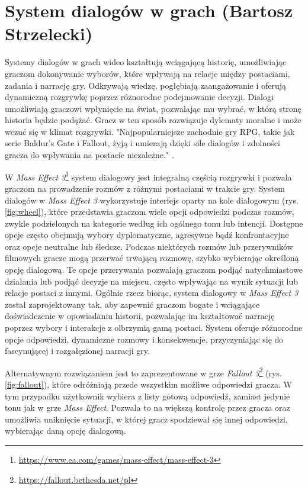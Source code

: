 \section{System dialogów w grach (Bartosz Strzelecki)}\label{chap:dialogi}
Systemy dialogów w grach wideo kształtują wciągającą historię, umożliwiając graczom dokonywanie wyborów, które wpływają na relacje między postaciami, zadania i narrację gry. 
Odkrywają wiedzę, pogłębiają zaangażowanie i oferują dynamiczną rozgrywkę poprzez różnorodne podejmowanie decyzji.
Dialogi umożliwiają graczowi wpłynięcie na świat, pozwalając mu wybrać, w którą stronę historia będzie podążać.
Gracz w ten sposób rozwiązuje dylematy moralne i może wczuć się w klimat rozgrywki.
"Najpopularniejsze zachodnie gry RPG, takie jak serie Baldur's Gate i Fallout, żyją i umierają dzięki sile dialogów i zdolności gracza do wpływania na postacie niezależne." \cite{dialogue}.

W \textit{Mass Effect 3}\footnote{\url{https://www.ea.com/games/mass-effect/mass-effect-3}} system dialogowy jest integralną częścią rozgrywki i pozwala graczom na prowadzenie rozmów z różnymi postaciami w trakcie gry.
System dialogów w \textit{Mass Effect 3} wykorzystuje interfejs oparty na kole dialogowym (rys. \ref{fig:wheel}), które
przedstawia graczom wiele opcji odpowiedzi podczas rozmów, zwykle podzielonych na kategorie według ich ogólnego tonu lub intencji.
Dostępne opcje często obejmują wybory dyplomatyczne, agresywne bądź konfrontacyjne oraz opcje neutralne lub śledcze.
Podczas niektórych rozmów lub przerywników filmowych gracze mogą przerwać trwającą rozmowę, szybko wybierając określoną opcję dialogową.
Te opcje przerywania pozwalają graczom podjąć natychmiastowe działania lub podjąć decyzje na miejscu, często wpływając na wynik sytuacji lub relacje postaci z innymi.
Ogólnie rzecz biorąc, system dialogowy w \textit{Mass Effect 3} został zaprojektowany tak, aby zapewnić graczom bogate i wciągające doświadczenie w opowiadaniu historii,
pozwalając im kształtować narrację poprzez wybory i interakcje z olbrzymią gamą postaci. System oferuje różnorodne opcje odpowiedzi, dynamiczne rozmowy i konsekwencje,
przyczyniając się do fascynującej i rozgałęzionej narracji gry.

Alternatywnym rozwiązaniem jest to zaprezentowane w grze \textit{Fallout 3}\footnote{\url{https://fallout.bethesda.net/pl}} (rys. \ref{fig:fallout}), które odróżniają przede wszystkim możliwe odpowiedzi gracza.
W tym przypadku użytkownik wybiera z listy gotową odpowiedź, zamiast jedynie tonu jak w grze \textit{Mass Effect}. Pozwala to na większą kontrolę
przez gracza oraz umożliwia uniknięcie sytuacji, w której gracz spodziewał się innej odpowiedzi, wybierając daną opcję dialogową.

